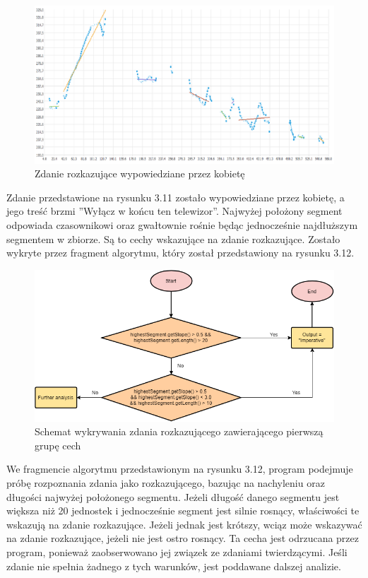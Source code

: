 \documentclass[a4paper,12 pt]{report}
\begin{document}
 \FloatBarrier
\begin{figure}[h]
\centering
\includegraphics[scale=0.85]{rozkaz_1_kobieta.pdf}
\caption{Zdanie rozkazujące wypowiedziane przez kobietę}
\end{figure}
\FloatBarrier

Zdanie przedstawione na rysunku 3.11 zostało wypowiedziane przez kobietę, a jego treść brzmi ''Wyłącz w końcu ten telewizor''. Najwyżej położony segment odpowiada czasownikowi oraz gwałtownie rośnie będąc jednocześnie najdłuższym segmentem w zbiorze. Są to cechy wskazujące na zdanie rozkazujące. 
Zostało wykryte przez fragment algorytmu, który został przedstawiony na rysunku 3.12.
 \FloatBarrier
\begin{figure}[h]
\centering
\includegraphics[scale=0.9]{Imperative1.png}
\caption{Schemat wykrywania zdania rozkazującego zawierającego pierwszą grupę cech}
\end{figure}
\FloatBarrier
We fragmencie algorytmu przedstawionym na rysunku 3.12, program podejmuje próbę rozpoznania zdania jako rozkazującego, bazując na nachyleniu oraz długości najwyżej położonego segmentu.
Jeżeli długość danego segmentu jest większa niż 20 jednostek i jednocześnie segment jest silnie rosnący, właściwości te wskazują na zdanie rozkazujące. Jeżeli jednak jest krótszy, wciąz może wskazywać na zdanie rozkazujące, jeżeli nie jest ostro rosnący. Ta cecha jest odrzucana przez program, ponieważ zaobserwowano jej związek ze zdaniami twierdzącymi. Jeśli zdanie nie spełnia żadnego z tych warunków, jest poddawane dalszej analizie.
\end{document}
